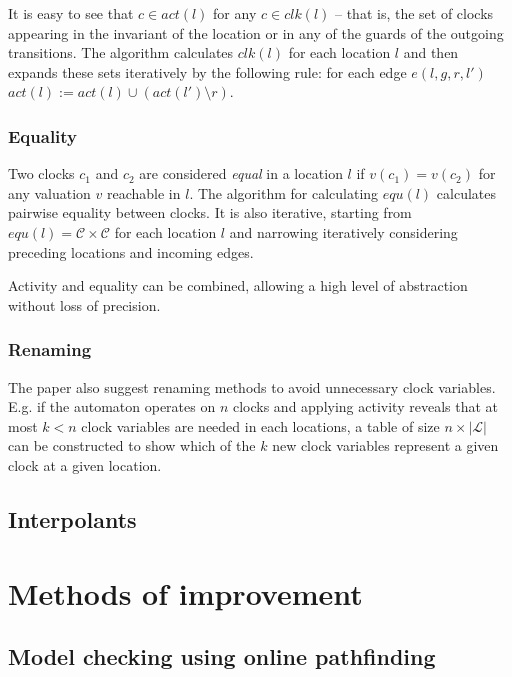 It is easy to see that $c \in act(l)$ for any $c \in clk(l)$ -- that is, the set of clocks appearing in the invariant of the location or in any of the guards of the outgoing transitions. The algorithm calculates $clk(l)$ for each location $l$ and then expands these sets iteratively by the following rule: for each edge $e(l,g,r,l')$ $act(l) := act(l) \cup ( act(l') \setminus r )$.


\subsubsection{Equality}

Two clocks $c_1$ and $c_2$ are considered \emph{equal} in a location $l$ if $v(c_1)=v(c_2)$ for any valuation $v$ reachable in $l$. The algorithm for calculating $equ(l)$ calculates pairwise equality between clocks. It is also iterative, starting from $equ(l)=\mathcal{C} \times \mathcal{C}$ for each location $l$ and narrowing iteratively considering preceding locations and incoming edges.

Activity and equality can be combined, allowing a high level of abstraction without loss of precision.

\subsubsection{Renaming} 

The paper also suggest renaming methods to avoid unnecessary clock variables. E.g. if the automaton operates on $n$ clocks and applying activity reveals that at most $k < n$ clock variables are needed in each locations, a table of size $n \times |\mathcal{L}|$ can be constructed to show which of the $k$ new clock variables represent a given clock at a given location.

\subsection{Interpolants}


\section{Methods of improvement}

\subsection{Model checking using online pathfinding}

